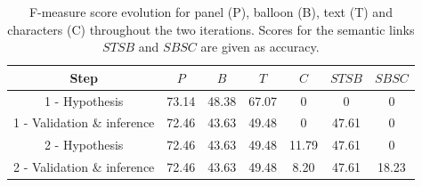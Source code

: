   \begin{table}[ht]
    \normalsize

    \centering
    \caption[F-measure score evolution for panel, balloon, text and characters throughout the two iterations]{F-measure score evolution for panel (P), balloon (B), text (T) and characters (C) throughout the two iterations. Scores for the semantic links $STSB$ and $SBSC$ are given as accuracy.}
    \setlength{\tabcolsep}{.45em}
    \begin{tabular}{|c|c|c|c|c|c|c|}

          \hline
        Step & $P$ & $B$ & $T$ & $C$ & $STSB$ & $SBSC$    \\
        \hline
        
        1 - Hypothesis              & 73.14   & 48.38  & 67.07 & 0  & 0 & 0  \\
        \hline
        1 - Validation \& inference  & 72.46   & 43.63  & 49.48 & 0  & 47.61 & 0  \\
        \hline
        2 - Hypothesis              & 72.46   & 43.63  & 49.48 & 11.79  & 47.61 & 0  \\
        \hline
        2 - Validation \& inference  & 72.46   & 43.63  & 49.48 & 8.20  & 47.61 & 18.23  \\
        \hline
        \end{tabular}
    \label{tab:ex:framework_evaluation_details}
  \end{table}%



